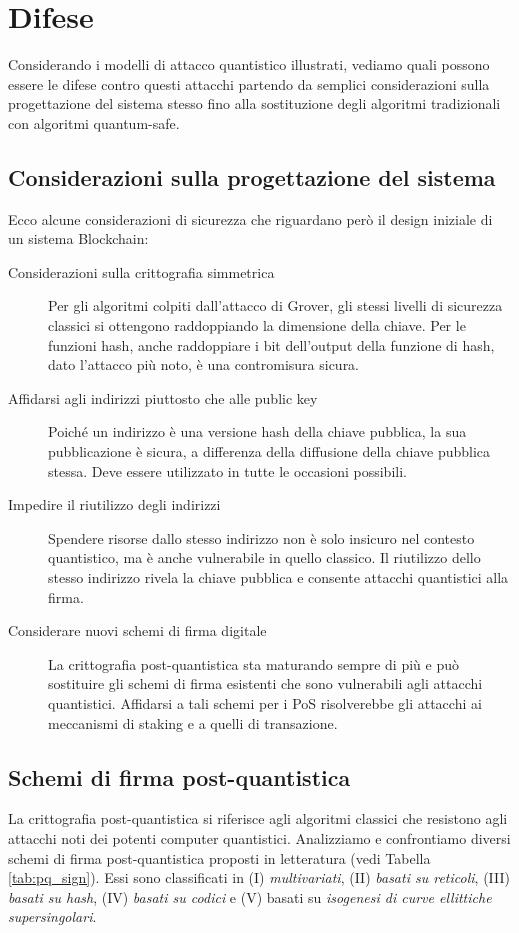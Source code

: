 \section{Difese}
Considerando i modelli di attacco quantistico illustrati, vediamo quali possono essere le difese contro questi attacchi partendo da semplici considerazioni sulla progettazione del sistema stesso fino alla sostituzione degli algoritmi tradizionali con algoritmi quantum-safe.

\subsection{Considerazioni sulla progettazione del sistema}
Ecco alcune considerazioni di sicurezza che riguardano però il design iniziale di un sistema Blockchain:

\begin{description}
  \item [Considerazioni sulla crittografia simmetrica] Per gli algoritmi colpiti dall'attacco di Grover, gli stessi livelli di sicurezza classici si ottengono raddoppiando la dimensione della chiave. Per le funzioni hash, anche raddoppiare i bit dell'output della funzione di hash, dato l'attacco più noto, è una contromisura sicura.
  \item [Affidarsi agli indirizzi piuttosto che alle public key] Poiché un indirizzo è una versione hash della chiave pubblica, la sua pubblicazione è sicura, a differenza della diffusione della chiave pubblica stessa. Deve essere utilizzato in tutte le occasioni possibili.
  \item [Impedire il riutilizzo degli indirizzi] Spendere risorse dallo stesso indirizzo non è solo insicuro nel contesto quantistico, ma è anche vulnerabile in quello classico. Il riutilizzo dello stesso indirizzo rivela la chiave pubblica e consente attacchi quantistici alla firma.
  \item [Considerare nuovi schemi di firma digitale] La crittografia post-quantistica sta maturando sempre di più e può sostituire gli schemi di firma esistenti che sono vulnerabili agli attacchi quantistici. Affidarsi a tali schemi per i PoS risolverebbe gli attacchi ai meccanismi di staking e a quelli di transazione.
\end{description}

\subsection{Schemi di firma post-quantistica}
La crittografia post-quantistica si riferisce agli algoritmi classici che resistono agli attacchi noti dei potenti computer quantistici. Analizziamo e confrontiamo diversi schemi di firma post-quantistica proposti in letteratura (vedi Tabella \ref{tab:pq_sign}). Essi sono classificati in (I) \textit{multivariati}, (II) \textit{basati su reticoli}, (III) \textit{basati su hash}, (IV) \textit{basati su codici} e (V) basati su \textit{isogenesi di curve ellittiche supersingolari}.

